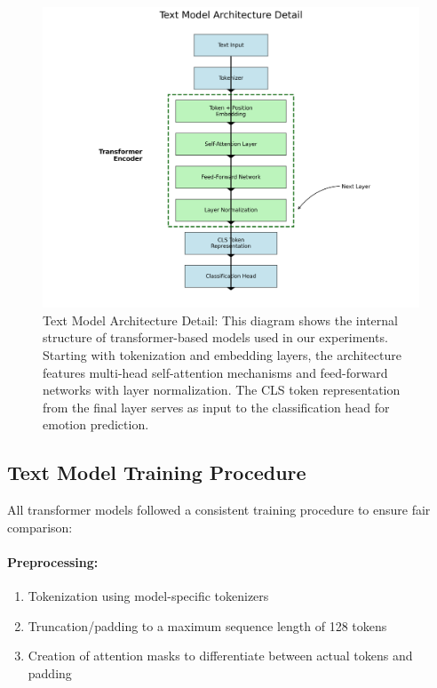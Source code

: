 \documentclass[12pt]{article}
\begin{document}
\begin{figure}[h]
    \centering
    \includegraphics[width=0.85\linewidth]{Figures/text_model_architecture.png}
    \caption{Text Model Architecture Detail: This diagram shows the internal structure of transformer-based models used in our experiments. Starting with tokenization and embedding layers, the architecture features multi-head self-attention mechanisms and feed-forward networks with layer normalization. The CLS token representation from the final layer serves as input to the classification head for emotion prediction.}
    \label{fig:text_model_architecture}
\end{figure}

\subsection{Text Model Training Procedure}
All transformer models followed a consistent training procedure to ensure fair comparison:

\paragraph{Preprocessing:}
\begin{enumerate}
    \item Tokenization using model-specific tokenizers
    \item Truncation/padding to a maximum sequence length of 128 tokens
    \item Creation of attention masks to differentiate between actual tokens and padding
\end{enumerate}
\end{document}
